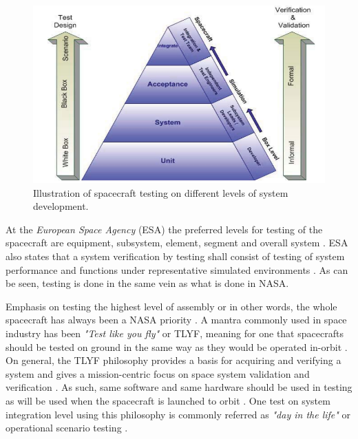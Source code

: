 \documentclass[english,12pt,a4paper,pdftex,elec,utf8]{aaltothesis}
\begin{document}
\begin{figure}[h!]
\centering
\includegraphics[scale=0.45]{spacetesting}
\caption{Illustration of spacecraft testing on different levels of system development. \cite{softacceptancespace, tor}}
\label{testlevelchart}
\end{figure}
At the \textit{European Space Agency} (ESA) the preferred levels for testing of the spacecraft are equipment, subsystem, element, segment and overall system \cite{ecss}. ESA also states that a system verification by testing shall consist of testing of system performance and functions under representative simulated environments \cite{ecss}. As can be seen, testing is done in the same vein as what is done in NASA. \par 
Emphasis on testing the highest level of assembly or in other words, the whole spacecraft has always been a NASA priority \cite{reliabilitylessonsfromnasa}. A mantra commonly used in space industry has been \textit{"Test like you fly"} or TLYF, meaning for one that spacecrafts should be tested on ground in the same way as they would be operated in-orbit \cite{satverplanning, tor}.  On general, the TLYF philosophy provides a basis for acquiring and verifying a system and gives a mission-centric focus on space system validation and verification \cite{tor}. As such, same software and same hardware should be used in testing as will be used when the spacecraft is launched to orbit \cite{satverplanning}. One test on system integration level using this philosophy is commonly referred as \textit{"day in the life"} or operational scenario testing \cite{satverplanning, tor}. \par
\end{document}
